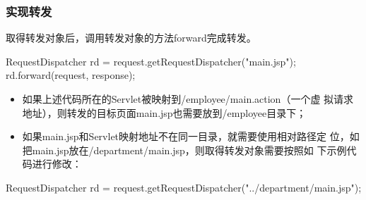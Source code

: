 \begin{frame}[fragile] %
  \frametitle{实现转发}

  取得转发对象后，调用转发对象的方法forward完成转发。

  \begin{javaCode}
    RequestDispatcher rd = request.getRequestDispatcher("main.jsp");
    rd.forward(request, response);
  \end{javaCode}

  
  \begin{itemize}\small\kai
  \item 如果上述代码所在的Servlet被映射到/employee/main.action（一个虚
    拟请求地址），则转发的目标页面main.jsp也需要放到/employee目录下；
  \item 如果main.jsp和Servlet映射地址不在同一目录，就需要使用相对路径定
    位，如把main.jsp放在/department/main.jsp，则取得转发对象需要按照如
    下示例代码进行修改：
  \end{itemize}

  \begin{javaCode}
    RequestDispatcher rd =
    request.getRequestDispatcher("../department/main.jsp");
  \end{javaCode}
\end{frame}

